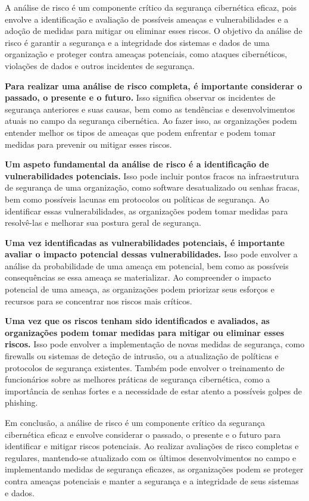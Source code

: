 A análise de risco é um componente crítico da segurança cibernética eficaz, pois envolve a identificação e avaliação de possíveis ameaças e vulnerabilidades e a adoção de medidas para mitigar ou eliminar esses riscos. O objetivo da análise de risco é garantir a segurança e a integridade dos sistemas e dados de uma organização e proteger contra ameaças potenciais, como ataques cibernéticos, violações de dados e outros incidentes de segurança.

\textbf{Para realizar uma análise de risco completa, é importante considerar o passado, o presente e o futuro.} Isso significa observar os incidentes de segurança anteriores e suas causas, bem como as tendências e desenvolvimentos atuais no campo da segurança cibernética. Ao fazer isso, as organizações podem entender melhor os tipos de ameaças que podem enfrentar e podem tomar medidas para prevenir ou mitigar esses riscos.

\textbf{Um aspeto fundamental da análise de risco é a identificação de vulnerabilidades potenciais.} Isso pode incluir pontos fracos na infraestrutura de segurança de uma organização, como software desatualizado ou senhas fracas, bem como possíveis lacunas em protocolos ou políticas de segurança. Ao identificar essas vulnerabilidades, as organizações podem tomar medidas para resolvê-las e melhorar sua postura geral de segurança.

\textbf{Uma vez identificadas as vulnerabilidades potenciais, é importante avaliar o impacto potencial dessas vulnerabilidades.} Isso pode envolver a análise da probabilidade de uma ameaça em potencial, bem como as possíveis consequências se essa ameaça se materializar. Ao compreender o impacto potencial de uma ameaça, as organizações podem priorizar seus esforços e recursos para se concentrar nos riscos mais críticos.

\textbf{Uma vez que os riscos tenham sido identificados e avaliados, as organizações podem tomar medidas para mitigar ou eliminar esses riscos.} Isso pode envolver a implementação de novas medidas de segurança, como firewalls ou sistemas de deteção de intrusão, ou a atualização de políticas e protocolos de segurança existentes. Também pode envolver o treinamento de funcionários sobre as melhores práticas de segurança cibernética, como a importância de senhas fortes e a necessidade de estar atento a possíveis golpes de phishing.

Em conclusão, a análise de risco é um componente crítico da segurança cibernética eficaz e envolve considerar o passado, o presente e o futuro para identificar e mitigar riscos potenciais. Ao realizar avaliações de risco completas e regulares, mantendo-se atualizado com os últimos desenvolvimentos no campo e implementando medidas de segurança eficazes, as organizações podem se proteger contra ameaças potenciais e manter a segurança e a integridade de seus sistemas e dados.

\newpage
